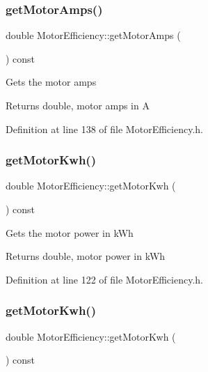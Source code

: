 \subsubsection{\texorpdfstring{get\+Motor\+Amps()}{getMotorAmps()}\hspace{0.1cm}{\footnotesize\ttfamily [3/3]}}
{\footnotesize\ttfamily double Motor\+Efficiency\+::get\+Motor\+Amps (\begin{DoxyParamCaption}{ }\end{DoxyParamCaption}) const\hspace{0.3cm}{\ttfamily [inline]}}

Gets the motor amps \begin{DoxyReturn}{Returns}
double, motor amps in A 
\end{DoxyReturn}


Definition at line 138 of file Motor\+Efficiency.\+h.

\mbox{\label{class_motor_efficiency_a4d21d0c44ee00f5d097b0acbcb73a8d8}} 
\subsubsection{\texorpdfstring{get\+Motor\+Kwh()}{getMotorKwh()}\hspace{0.1cm}{\footnotesize\ttfamily [1/3]}}
{\footnotesize\ttfamily double Motor\+Efficiency\+::get\+Motor\+Kwh (\begin{DoxyParamCaption}{ }\end{DoxyParamCaption}) const\hspace{0.3cm}{\ttfamily [inline]}}

Gets the motor power in k\+Wh \begin{DoxyReturn}{Returns}
double, motor power in k\+Wh 
\end{DoxyReturn}


Definition at line 122 of file Motor\+Efficiency.\+h.

\mbox{\label{class_motor_efficiency_a4d21d0c44ee00f5d097b0acbcb73a8d8}} 
\subsubsection{\texorpdfstring{get\+Motor\+Kwh()}{getMotorKwh()}\hspace{0.1cm}{\footnotesize\ttfamily [2/3]}}
{\footnotesize\ttfamily double Motor\+Efficiency\+::get\+Motor\+Kwh (\begin{DoxyParamCaption}{ }\end{DoxyParamCaption}) const\hspace{0.3cm}{\ttfamily [inline]}}

